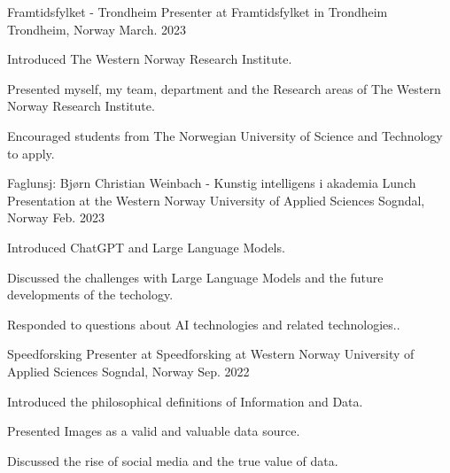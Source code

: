\begin{cventries}
  \cventry
    {Framtidsfylket - Trondheim} %
    {Presenter at Framtidsfylket in Trondheim} %
    {Trondheim, Norway} %
    {March. 2023} %
    {
      \begin{cvitems} %
        \item {Introduced The Western Norway Research Institute.}
        \item {Presented myself, my team, department and the Research areas of The Western Norway Research Institute.}
        \item {Encouraged students from The Norwegian University of Science and Technology to apply}.
      \end{cvitems}
  }

  \cventry
    {Faglunsj: Bjørn Christian Weinbach - Kunstig intelligens i akademia} %
    {Lunch Presentation at the Western Norway University of Applied Sciences} %
    {Sogndal, Norway} %
    {Feb. 2023} %
    {
      \begin{cvitems} %
        \item {Introduced ChatGPT and Large Language Models.}
        \item {Discussed the challenges with Large Language Models and the future developments of the techology.}
        \item {Responded to questions about AI technologies and related technologies.}.
      \end{cvitems}
    }

  \cventry
    {Speedforsking} %
    {Presenter at Speedforsking at Western Norway University of Applied Sciences} %
    {Sogndal, Norway} %
    {Sep. 2022} %
    {
      \begin{cvitems} %
        \item {Introduced the philosophical definitions of Information and Data.}
        \item {Presented Images as a valid and valuable data source.}
        \item {Discussed the rise of social media and the true value of data.}
      \end{cvitems}
    }
\end{cventries}
